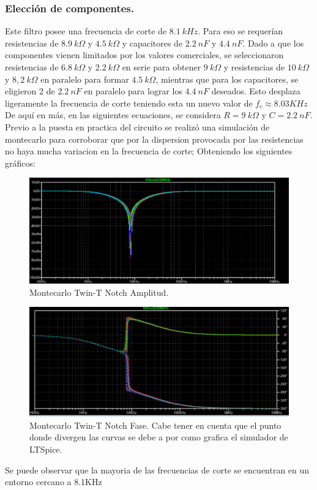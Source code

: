 \documentclass[a4paper]{article}
\begin{document}
\subsubsection{Elección de componentes.}
 Este filtro posee una frecuencia de corte de $ 8.1 \ kHz $. Para eso se requerían resistencias de $ 8.9 \ k\Omega $ y $ 4.5 \ k\Omega $ y capacitores de $ 2.2 \ nF $ y $ 4.4 \ nF $.
Dado a que los componentes vienen limitados por los valores comerciales,  se seleccionaron resistencias de $ 6.8 \ k\Omega $ y $ 2.2 \ k\Omega $ en serie para obtener  $ 9 \ k\Omega $ y  resistencias de $ 10 \ k\Omega $ y $ 8,2 \ k\Omega $ en paralelo para formar $ 4.5 \ k\Omega $, mientras que para los capacitores, se eligieron 2 de $ 2.2 \ nF $ en paralelo para lograr los $ 4.4 \ nF $ deseados. Esto desplaza ligeramente la frecuencia de corte teniendo esta un nuevo valor de $f_c \approx 8.03 KHz$
De aquí en más, en las siguientes ecuaciones, se considera $ R = 9 \ k\Omega $ y $ C = 2.2 \ nF $.
Previo a la puesta en practica del circuito se realizó una simulación de montecarlo para corroborar que por la dispersion provocada por las resistencias no haya mucha variacion en la frecuencia de corte; Obteniendo los siguientes gráficos:
\begin{figure}[H]
	\centering
	\includegraphics[width=\textwidth ]{Montecarlo.PNG}
\caption{Montecarlo Twin-T Notch Amplitud.}
	\label{fig:Montecarlo}
\end{figure}
\begin{figure}[H]
	\centering
	\includegraphics[width=\textwidth]{MontecarloPh.PNG}
\caption{Montecarlo Twin-T Notch Fase. Cabe tener en cuenta que el punto donde divergen las curvas se debe a por como grafica el simulador de LTSpice.}
	\label{fig:MontecarloFase}
\end{figure}
Se puede observar que la mayoria de las frecuencias de corte se encuentran en un entorno cercano a 8.1KHz
\end{document}
